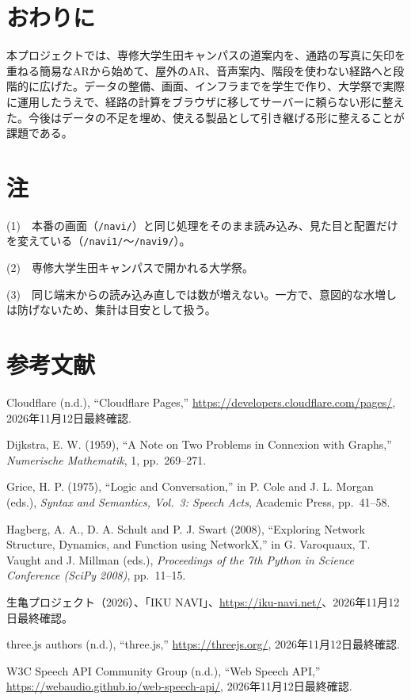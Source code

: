 \documentclass[
  paper=a4paper,
  fontsize=10.5pt,
  jafontsize=10.5pt,
  twocolumn,
  line_length=82.5mm,   %
  column_gap=5mm,
  gutter=20mm,          %
  number_of_lines=35,   %
  head_space=25mm,      %
  baselineskip=20.36pt, %
]{jlreq}
\begin{document}
\section{おわりに}

本プロジェクトでは、専修大学生田キャンパスの道案内を、通路の写真に矢印を重ねる簡易なARから始めて、屋外のAR、音声案内、階段を使わない経路へと段階的に広げた。データの整備、画面、インフラまでを学生で作り、大学祭で実際に運用したうえで、経路の計算をブラウザに移してサーバーに頼らない形に整えた。今後はデータの不足を埋め、使える製品として引き継げる形に整えることが課題である。

\section*{注}

\noindent(1)\ \ 本番の画面（\texttt{/navi/}）と同じ処理をそのまま読み込み、見た目と配置だけを変えている（\texttt{/navi1/}〜\texttt{/navi9/}）。

\noindent(2)\ \ 専修大学生田キャンパスで開かれる大学祭。

\noindent(3)\ \ 同じ端末からの読み込み直しでは数が増えない。一方で、意図的な水増しは防げないため、集計は目安として扱う。

\section*{参考文献}

{\setlength{\parindent}{0pt}\setlength{\hangindent}{1\zw}\raggedright
\everypar{\hangindent=1\zw}

Cloudflare (n.d.), ``Cloudflare Pages,'' \url{https://developers.cloudflare.com/pages/}, 2026年11月12日最終確認.\par

Dijkstra, E. W. (1959), ``A Note on Two Problems in Connexion with Graphs,'' \textit{Numerische Mathematik}, 1, pp.~269--271.\par

Grice, H. P. (1975), ``Logic and Conversation,'' in P. Cole and J. L. Morgan (eds.), \textit{Syntax and Semantics, Vol.~3: Speech Acts}, Academic Press, pp.~41--58.\par

Hagberg, A. A., D. A. Schult and P. J. Swart (2008), ``Exploring Network Structure, Dynamics, and Function using NetworkX,'' in G. Varoquaux, T. Vaught and J. Millman (eds.), \textit{Proceedings of the 7th Python in Science Conference (SciPy 2008)}, pp.~11--15.\par

生亀プロジェクト（2026）、「IKU NAVI」、\url{https://iku-navi.net/}、2026年11月12日最終確認。\par

three.js authors (n.d.), ``three.js,'' \url{https://threejs.org/}, 2026年11月12日最終確認.\par

W3C Speech API Community Group (n.d.), ``Web Speech API,'' \url{https://webaudio.github.io/web-speech-api/}, 2026年11月12日最終確認.\par
}
\end{document}
